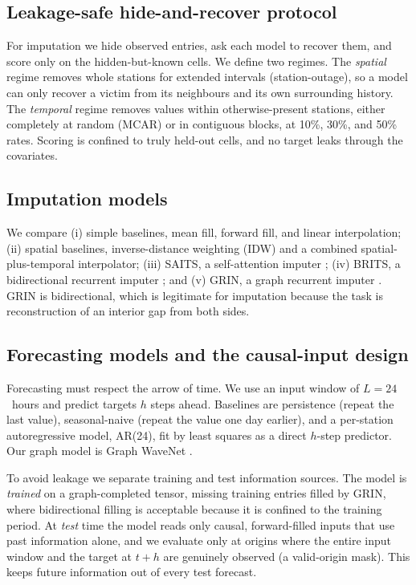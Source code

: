 \documentclass[11pt]{article}
\begin{document}
\subsection{Leakage-safe hide-and-recover protocol}
For imputation we hide observed entries, ask each model to recover them, and
score only on the hidden-but-known cells. We define two regimes. The
\emph{spatial} regime removes whole stations for extended intervals
(station-outage), so a model can only recover a victim from its neighbours and
its own surrounding history. The \emph{temporal} regime removes values within
otherwise-present stations, either completely at random (MCAR) or in contiguous
blocks, at 10\%, 30\%, and 50\% rates. Scoring is confined to truly held-out
cells, and no target leaks through the covariates.

\subsection{Imputation models}
We compare (i) simple baselines, mean fill, forward fill, and linear
interpolation; (ii) spatial baselines, inverse-distance weighting (IDW) and a
combined spatial-plus-temporal interpolator; (iii) SAITS, a self-attention
imputer \citep{saits}; (iv) BRITS, a bidirectional recurrent imputer
\citep{brits}; and (v) GRIN, a graph recurrent imputer \citep{grin}. GRIN is
bidirectional, which is legitimate for imputation because the task is
reconstruction of an interior gap from both sides.

\subsection{Forecasting models and the causal-input design}
Forecasting must respect the arrow of time. We use an input window of
$L=24$~hours and predict targets $h$ steps ahead. Baselines are persistence
(repeat the last value), seasonal-naive (repeat the value one day earlier), and a
per-station autoregressive model, AR(24), fit by least squares as a direct
$h$-step predictor. Our graph model is Graph WaveNet \citep{gwn}.

To avoid leakage we separate training and test information sources. The model is
\emph{trained} on a graph-completed tensor, missing training entries filled by
GRIN, where bidirectional filling is acceptable because it is confined to the
training period. At \emph{test} time the model reads only causal,
forward-filled inputs that use past information alone, and we evaluate only at
origins where the entire input window and the target at $t+h$ are genuinely
observed (a valid-origin mask). This keeps future information out of every test
forecast.
\end{document}
